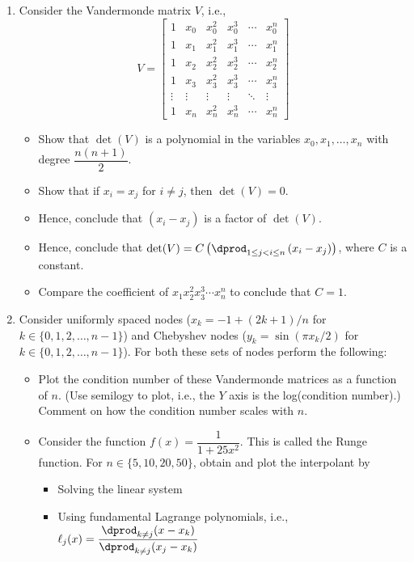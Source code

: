 \documentclass{article}
\begin{document}
	\begin{enumerate}
		\item
		Consider the Vandermonde matrix $V$, i.e.,
		$$V = \begin{bmatrix}
		1 & x_0 & x_0^2 & x_0^3 & \cdots & x_0^n\\
		1 & x_1 & x_1^2 & x_1^3 & \cdots & x_1^n\\
		1 & x_2 & x_2^2 & x_2^3 & \cdots & x_2^n\\
		1 & x_3 & x_3^2 & x_3^3 & \cdots & x_3^n\\
		\vdots & \vdots & \vdots & \vdots & \ddots & \vdots\\
		1 & x_n & x_n^2 & x_n^3 & \cdots & x_n^{n}
		\end{bmatrix}$$
		\begin{itemize}
			\item
			Show that $\det(V)$ is a polynomial in the variables $x_0,x_1,\ldots,x_n$ with degree $\dfrac{n(n+1)}2$.
			\item
			Show that if $x_i=x_j$ for $i \neq j$, then $\det(V) = 0$.
			\item
			Hence, conclude that $(x_i-x_j)$ is a factor of $\det(V)$.
			\item
			Hence, conclude that $\det(V) = C \left(\dprod_{1 \leq j <i \leq n} \left(x_i-x_j\right) \right)$, where $C$ is a constant.
			\item
			Compare the coefficient of $x_1x_2^2x_3^3 \cdots x_n^n$ to conclude that $C=1$.
		\end{itemize}
		\item
		Consider uniformly spaced nodes ($x_k = -1+(2k+1)/n$ for $k \in \{0,1,2,\ldots,n-1\}$) and Chebyshev nodes ($y_k= \sin(\pi x_k/2)$ for $k \in \{0,1,2,\ldots,n-1\}$). For both these sets of nodes perform the following:
		\begin{itemize}
			\item
			Plot the condition number of these Vandermonde matrices as a function of $n$. (Use semilogy to plot, i.e., the $Y$ axis is the log(condition number).) Comment on how the condition number scales with $n$.
			\item
			Consider the function $f(x) = \dfrac1{1+25x^2}$. This is called the Runge function. For $n \in \{5,10,20,50\}$, obtain and plot the interpolant by
			\begin{itemize}
				\item
				Solving the linear system
				\item
				Using fundamental Lagrange polynomials, i.e., $\ell_j(x) = \dfrac{\dprod_{k \neq j} (x-x_k)}{\dprod_{k \neq j}(x_j-x_k)}$

\end{itemize}
\end{itemize}
\end{enumerate}
\end{document}
